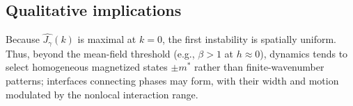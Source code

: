 \documentclass[11pt,a4paper]{article}
\begin{document}
\subsection{Qualitative implications}
Because $\widehat{J_\gamma}(k)$ is maximal at $k=0$, the first instability is spatially uniform. Thus, beyond the mean-field threshold (e.g., $\beta>1$ at $h\approx0$), dynamics tends to select homogeneous magnetized states $\pm m^*$ rather than finite-wavenumber patterns; interfaces connecting phases may form, with their width and motion modulated by the nonlocal interaction range.



\nocite{*}
\printbibliography
\end{document}
